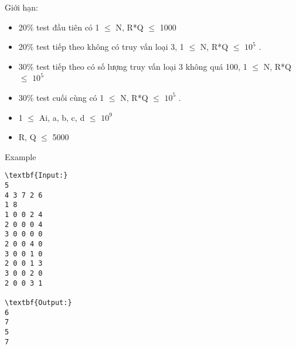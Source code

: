 Giới hạn:
\begin{itemize}
	\item 20\% test đầu tiên có 1  $\le$  N, R*Q  $\le$  1000
	\item 20\% test tiếp theo không có truy vấn loại 3, 1  $\le$  N, R*Q  $\le$  $10^{5}$ .
	\item 30\% test tiếp theo có số lượng truy vấn loại 3 không quá 100, 1  $\le$  N, R*Q  $\le$  $10^{5}$
	\item 30\% test cuối cùng có 1  $\le$  N, R*Q  $\le$  $10^{5}$ .
	\item 1  $\le$  Ai, a, b, c, d  $\le$  $10^{9}$
	\item R, Q  $\le$  5000
\end{itemize}
Example
\begin{verbatim}
\textbf{Input:}
5
4 3 7 2 6
1 8
1 0 0 2 4
2 0 0 0 4
3 0 0 0 0
2 0 0 4 0
3 0 0 1 0
2 0 0 1 3
3 0 0 2 0
2 0 0 3 1

\textbf{Output:}
6
7
5
7
\end{verbatim}